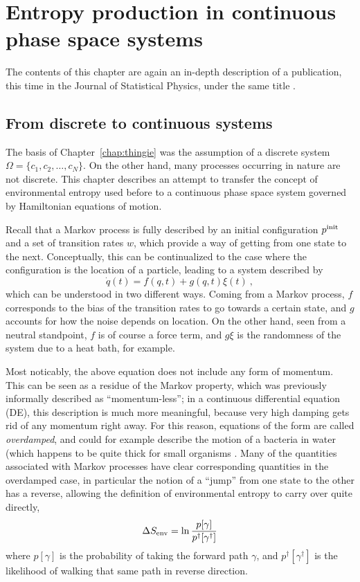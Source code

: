 \chapter{Entropy production in continuous phase space systems}
\label{chap:flow}

The contents of this chapter are again an in-depth description of a publication, this time in the Journal of Statistical Physics, under the same title \cite{flow-paper}.



\section{From discrete to continuous systems}

The basis of Chapter~\ref{chap:thingie} was the assumption of a discrete system \(\Omega = \{c_1, c_2, \ldots, c_N\}\). On the other hand, many processes occurring in nature are not discrete. This chapter describes an attempt to transfer the concept of environmental entropy used before to a continuous phase space system governed by Hamiltonian equations of motion.

Recall that a Markov process is fully described by an initial configuration \(p^{\text{init}}\) and a set of transition rates \(w\), which provide a way of getting from one state to the next. Conceptually, this can be continualized to the case where the configuration is the location of a particle, leading to a system described by
%
\begin{equation}
	\label{eqn:overdamped}
	\dot q(t) = f(q,t) + g(q,t)\xi(t) ~,
\end{equation}
%
which can be understood in two different ways. Coming from a Markov process, \(f\) corresponds to the bias of the transition rates to go towards a certain state, and \(g\) accounts for how the noise depends on location. On the other hand, seen from a neutral standpoint, \(f\) is of course a force term, and \(g\xi\) is the randomness of the system due to a heat bath, for example.

Most noticably, the above equation does not include any form of momentum. This can be seen as a residue of the Markov property, which was previously informally described as ``momentum-less''; in a continuous differential equation (DE), this description is much more meaningful, because very high damping gets rid of any momentum right away. For this reason, equations of the form  are called \emph{overdamped}, and could for example describe the motion of a bacteria in water (which happens to be quite thick for small organisms \cite{sengupta}. Many of the quantities associated with Markov processes have clear corresponding quantities in the overdamped case, in particular the notion of a ``jump'' from one state to the other has a reverse, allowing the definition of environmental entropy to carry over quite directly,
%
\begin{equation}
	\Delta S_\text{env} = \ln\frac{p[\gamma]}{p^\dagger[\gamma^\dagger]}
\end{equation}
%
where \(p[\gamma]\) is the probability of taking the forward path \(\gamma\), and \(p^\dagger[\gamma^\dagger]\) is the likelihood of walking that same path in reverse direction.


